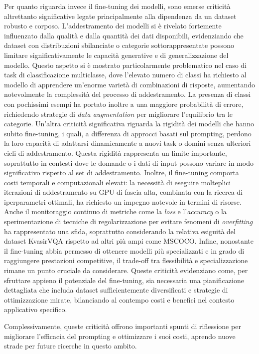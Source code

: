 \documentclass[../main.tex]{subfiles}
\begin{document}
Per quanto riguarda invece il fine-tuning dei modelli, sono emerse criticità altrettanto significative legate principalmente alla dipendenza da un dataset robusto e corposo.
L'addestramento dei modelli si è rivelato fortemente influenzato dalla qualità e dalla quantità dei dati disponibili, evidenziando che dataset con distribuzioni sbilanciate o categorie sottorappresentate possono limitare significativamente le capacità generative e di generalizzazione del modello. 
Questo aspetto si è mostrato particolarmente problematico nel caso di task di classificazione multiclasse, dove l'elevato numero di classi ha richiesto al modello di apprendere un'enorme varietà di combinazioni di risposte, aumentando notevolmente la complessità del processo di addestramento. 
La presenza di classi con pochissimi esempi ha portato inoltre a una maggiore probabilità di errore, richiedendo strategie di \textit{data augmentation} per migliorare l'equilibrio tra le categorie. 
Un'altra criticità significativa riguarda la rigidità dei modelli che hanno subito fine-tuning, i quali, a differenza di approcci basati sul prompting, perdono la loro capacità di adattarsi dinamicamente a nuovi task o domini senza ulteriori cicli di addestramento. 
Questa rigidità rappresenta un limite importante, soprattutto in contesti dove le domande o i dati di input possono variare in modo significativo rispetto al set di addestramento. 
Inoltre, il fine-tuning comporta costi temporali e computazionali elevati: la necessità di eseguire molteplici iterazioni di addestramento su GPU di fascia alta, combinata con la ricerca di iperparametri ottimali, ha richiesto un impegno notevole in termini di risorse. 
Anche il monitoraggio continuo di metriche come la \textit{loss} e l'\textit{accuracy} o la sperimentazione di tecniche di regolarizzazione per evitare fenomeni di \textit{overfitting} ha rappresentato una sfida, soprattutto considerando la relativa esiguità del dataset KvasirVQA rispetto ad altri più ampi come MSCOCO.
Infine, nonostante il fine-tuning abbia permesso di ottenere modelli più specializzati e in grado di raggiungere prestazioni competitive, il trade-off tra flessibilità e specializzazione rimane un punto cruciale da considerare. 
Queste criticità evidenziano come, per sfruttare appieno il potenziale del fine-tuning, sia necessaria una pianificazione dettagliata che includa dataset sufficientemente diversificati e strategie di ottimizzazione mirate, bilanciando al contempo costi e benefici nel contesto applicativo specifico.

Complessivamente, queste criticità offrono importanti spunti di riflessione per migliorare l'efficacia del prompting e ottimizzare i suoi costi, aprendo nuove strade per future ricerche in questo ambito. 
\end{document}
